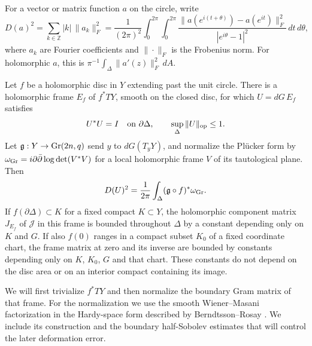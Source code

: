 For a vector or matrix function $a$ on the circle, write
\begin{equation}\label{disc:half-sobolev}
 D(a)^2=\sum_{k\in\mathbb Z}|k|\,\|a_k\|_F^2
 =\frac1{(2\pi)^2}\int_0^{2\pi}\!\int_0^{2\pi}
 \frac{\|a(e^{i(t+\theta)})-a(e^{it})\|_F^2}
 {|e^{i\theta}-1|^2}\,dt\,d\theta,
\end{equation}
where $a_k$ are Fourier coefficients and $\|\cdot\|_F$ is the
Frobenius norm.  For holomorphic $a$, this is
$\pi^{-1}\int_\Delta\|a'(z)\|_F^2\,dA$.

\begin{lemma}\label{lem:disc-frames}
Let $f$ be a holomorphic disc in $Y$ extending past the unit circle.
There is a holomorphic frame $E_f$ of $f^*TY$, smooth on the closed
disc, for which $U=dG\,E_f$ satisfies
\begin{equation}\label{disc:frame-unitary}
 U^*U=I\quad\hbox{on }\partial\Delta,\qquad
 \sup_\Delta\|U\|_{\mathrm{op}}\le1.
\end{equation}
Let $\mathfrak g:Y\to\operatorname{Gr}(2n,q)$ send $y$ to $dG(T_yY)$, and
normalize the Pl\"ucker form by
$\omega_{\operatorname{Gr}}=i\partial\bar\partial\log\det(V^*V)$ for a local
holomorphic frame $V$ of its tautological plane.  Then
\begin{equation}\label{disc:gauss-area}
 D(U)^2=\frac1{2\pi}\int_\Delta
                          (\mathfrak g\circ f)^*\omega_{\operatorname{Gr}}.
\end{equation}
If $f(\partial\Delta)\subset K$ for a fixed compact $K\subset Y$,
the holomorphic component matrix $J_{E_f}$ of $\mathcal J$ in this
frame is bounded throughout $\Delta$ by a constant depending only
on $K$ and $G$.  If also $f(0)$ ranges in a compact subset $K_0$
of a fixed coordinate chart, the frame matrix at zero and its
inverse are bounded by constants depending only on $K$, $K_0$, $G$
and that chart.  These constants do not depend on the disc area or
on an interior compact containing its image.
\end{lemma}

We will first trivialize $f^*TY$ and then normalize the boundary Gram
matrix of that frame.  For the normalization we use the smooth
Wiener--Masani factorization \cite{WienerMasani1957} in the Hardy-space
form described by Berndtsson--Rosay
\cite[Theorem~2.1 and Section~6]{BerndtssonRosay}.
We include its construction and the boundary half-Sobolev estimates
that will control the later deformation error.


